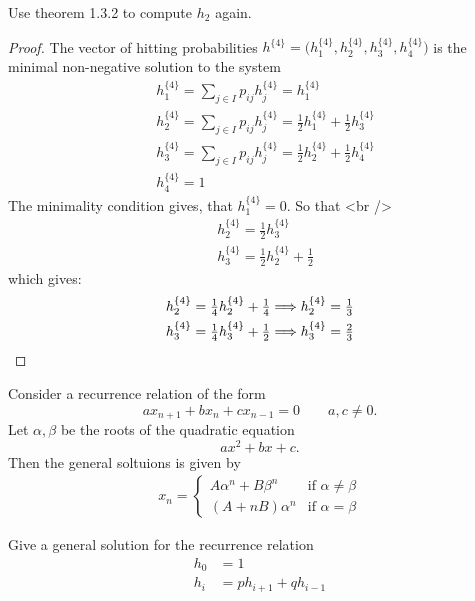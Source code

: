 \begin{thm}
Use theorem 1.3.2 to compute \(h_{2}\) again.
\end{thm}

\begin{proof}
The vector of hitting probabilities \(h^{\{4\}}=\Big(h_{1}^{\{4\}},h_{2}^{\{4\}},h_{3}^{\{4\}},h_{4}^{\{4\}}\Big)\) is the minimal non-negative solution to the system
\begin{align*}
&h_{1}^{\{4\}}=\sum _{j\in I}p_{ij}h_{j}^{\{4\}}=h_{1}^{\{4\}}\\
&h_{2}^{\{4\}}=\sum _{j\in I}p_{ij}h_{j}^{\{4\}}=\tfrac{1}{2}h_{1}^{\{4\}}+\tfrac{1}{2}h_{3}^{\{4\}}\\
&h_{3}^{\{4\}}=\sum _{j\in I}p_{ij}h_{j}^{\{4\}}=\tfrac{1}{2}h_{2}^{\{4\}}+\tfrac{1}{2}h_{4}^{\{4\}}\\
&h_{4}^{\{4\}}=1
\end{align*}
The minimality condition gives, that \(h_{1}^{\{4\}}=0\). So that <br />
\begin{align*}
&h_{2}^{\{4\}}=\tfrac{1}{2}h_{3}^{\{4\}}\\
&h_{3}^{\{4\}}=\tfrac{1}{2}h_{2}^{\{4\}}+\tfrac{1}{2}
\end{align*}
which gives:
\begin{align*}
&h_{2}^{\{4\}}=\tfrac{1}{4}h_{2}^{\{4\}}+\tfrac{1}{4}\space \Longrightarrow \space h_{2}^{\{4\}}=\tfrac{1}{3}\\
&h_{3}^{\{4\}}=\tfrac{1}{4}h_{3}^{\{4\}}+\tfrac{1}{2}\space \Longrightarrow \space h_{3}^{\{4\}}=\tfrac{2}{3}
\end{align*}
\end{proof}

\begin{thm}
Consider a recurrence relation of the form
\[
ax_{n+1}+bx_{n}+cx_{n-1}=0 \qquad a,c\neq 0.
\]
Let \(\alpha ,\beta \) be the roots of the quadratic equation
\[
ax^2+bx+c.
\]
Then the general soltuions is given by
\begin{align*}
x_{n}=\begin{cases}A\alpha ^n+B\beta ^n &\text{if }\alpha \neq \beta \\ (A+nB)\alpha ^n &\text{if }\alpha =\beta \end{cases}
\end{align*}
\end{thm}

\begin{prop}
Give a general solution for the recurrence relation
\begin{align*}
h_{0}&=1 \\
h_{i}&=ph_{i+1} +qh_{i-1}
\end{align*}
\end{prop}

